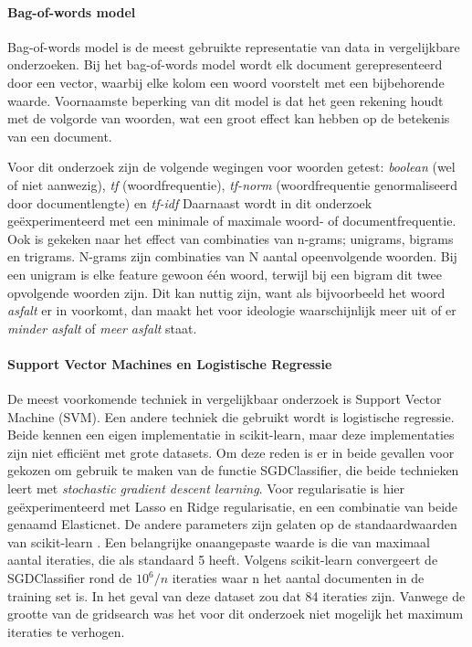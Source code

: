 \paragraph{Bag-of-words model}
Bag-of-words model is de meest gebruikte representatie van data in vergelijkbare onderzoeken. Bij het bag-of-words model wordt elk document gerepresenteerd door een vector, waarbij elke kolom een woord voorstelt met een bijbehorende waarde. Voornaamste beperking van dit model is dat het geen rekening houdt met de volgorde van woorden, wat een groot effect kan hebben op de betekenis van een document.\par
Voor dit onderzoek zijn de volgende wegingen voor woorden getest: \textit{boolean} (wel of niet aanwezig), \textit{tf} (woordfrequentie), \textit{tf-norm} (woordfrequentie genormaliseerd door documentlengte) en \textit{tf-idf}
Daarnaast wordt in dit onderzoek geëxperimenteerd met een minimale of maximale woord- of documentfrequentie. Ook is gekeken naar het effect van combinaties van n-grams; unigrams, bigrams en trigrams. N-grams zijn combinaties van N aantal opeenvolgende woorden. Bij een unigram is elke feature gewoon één woord, terwijl bij een bigram dit twee opvolgende woorden zijn. Dit kan nuttig zijn, want als bijvoorbeeld het woord \textit{asfalt} er in voorkomt, dan maakt het voor ideologie waarschijnlijk meer uit of er \textit{minder asfalt} of \textit{meer asfalt} staat.\par

\paragraph{Support Vector Machines en Logistische Regressie}
De meest voorkomende techniek in vergelijkbaar onderzoek is Support Vector Machine (SVM). Een andere techniek die gebruikt wordt is logistische regressie. Beide kennen een eigen implementatie in scikit-learn, maar deze implementaties zijn niet efficiënt met grote datasets. Om deze reden is er in beide gevallen voor gekozen om gebruik te maken van de functie SGDClassifier, die beide technieken leert met \textit{stochastic gradient descent learning}. Voor regularisatie is hier geëxperimenteerd met Lasso en Ridge regularisatie, en een combinatie van beide genaamd Elasticnet. De andere parameters zijn gelaten op de standaardwaarden van scikit-learn \cite{scikit-learn}. Een belangrijke onaangepaste waarde is die van maximaal aantal iteraties, die als standaard 5 heeft. Volgens scikit-learn convergeert de SGDClassifier rond de $10^{6}/n$ iteraties waar n het aantal documenten in de training set is. In het geval van deze dataset zou dat 84 iteraties zijn. Vanwege de grootte van de gridsearch was het voor dit onderzoek niet mogelijk het maximum iteraties te verhogen.\par

